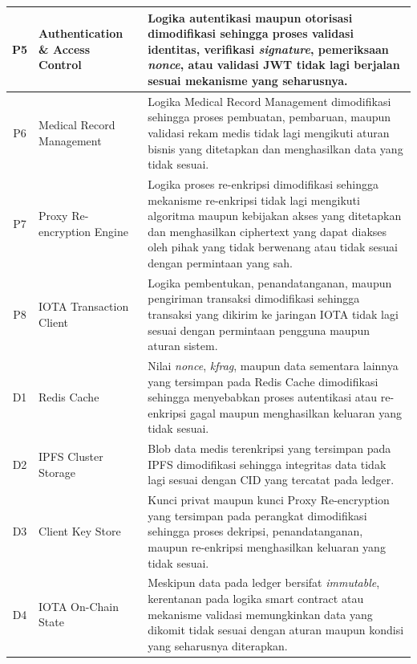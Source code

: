 \begin{xltabular}{\textwidth}{|c|>{\raggedright\arraybackslash}p{3.2cm}|X|}
    P5 &
    Authentication \& Access Control &
    Logika autentikasi maupun otorisasi dimodifikasi sehingga proses validasi identitas, verifikasi \textit{signature}, pemeriksaan \textit{nonce}, atau validasi JWT tidak lagi berjalan sesuai mekanisme yang seharusnya. \\
    \hline

    P6 &
    Medical Record Management &
    Logika Medical Record Management dimodifikasi sehingga proses pembuatan, pembaruan, maupun validasi rekam medis tidak lagi mengikuti aturan bisnis yang ditetapkan dan menghasilkan data yang tidak sesuai. \\
    \hline

    P7 &
    Proxy Re-encryption Engine &
    Logika proses re-enkripsi dimodifikasi sehingga mekanisme re-enkripsi tidak lagi mengikuti algoritma maupun kebijakan akses yang ditetapkan dan menghasilkan ciphertext yang dapat diakses oleh pihak yang tidak berwenang atau tidak sesuai dengan permintaan yang sah. \\
    \hline

    P8 &
    IOTA Transaction Client &
    Logika pembentukan, penandatanganan, maupun pengiriman transaksi dimodifikasi sehingga transaksi yang dikirim ke jaringan IOTA tidak lagi sesuai dengan permintaan pengguna maupun aturan sistem. \\
    \hline

    D1 &
    Redis Cache &
    Nilai \textit{nonce}, \textit{kfrag}, maupun data sementara lainnya yang tersimpan pada Redis Cache dimodifikasi sehingga menyebabkan proses autentikasi atau re-enkripsi gagal maupun menghasilkan keluaran yang tidak sesuai. \\
    \hline

    D2 &
    IPFS Cluster Storage &
    Blob data medis terenkripsi yang tersimpan pada IPFS dimodifikasi sehingga integritas data tidak lagi sesuai dengan CID yang tercatat pada ledger. \\
    \hline

    D3 &
    Client Key Store &
    Kunci privat maupun kunci Proxy Re-encryption yang tersimpan pada perangkat dimodifikasi sehingga proses dekripsi, penandatanganan, maupun re-enkripsi menghasilkan keluaran yang tidak sesuai. \\
    \hline

    D4 &
    IOTA On-Chain State &
    Meskipun data pada ledger bersifat \textit{immutable}, kerentanan pada logika smart contract atau mekanisme validasi memungkinkan data yang dikomit tidak sesuai dengan aturan maupun kondisi yang seharusnya diterapkan. \\
    \hline


\end{xltabular}
